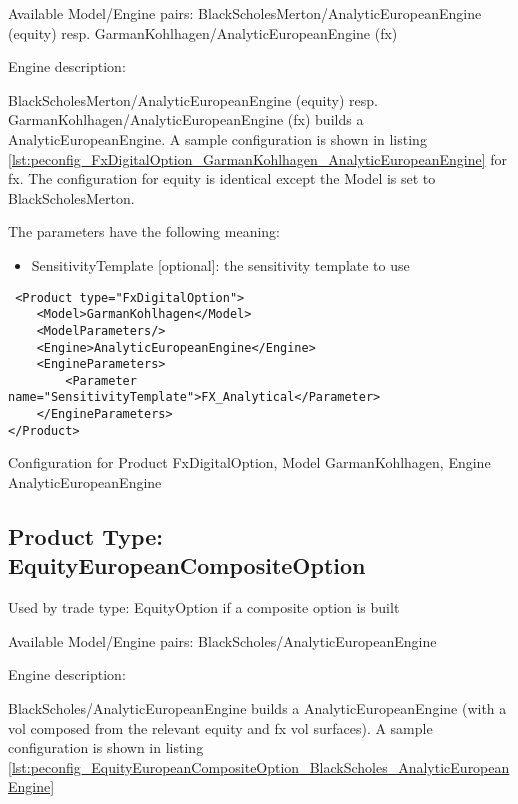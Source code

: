Available Model/Engine pairs: BlackScholesMerton/AnalyticEuropeanEngine (equity)
resp. GarmanKohlhagen/AnalyticEuropeanEngine (fx)

Engine description:

BlackScholesMerton/AnalyticEuropeanEngine (equity) resp. GarmanKohlhagen/AnalyticEuropeanEngine (fx) builds a
AnalyticEuropeanEngine. A sample configuration is shown in listing
\ref{lst:peconfig_FxDigitalOption_GarmanKohlhagen_AnalyticEuropeanEngine} for fx. The configuration for equity is
identical except the Model is set to BlackScholesMerton.

The parameters have the following meaning:

\begin{itemize}
\item SensitivityTemplate [optional]: the sensitivity template to use 
\end{itemize}

\begin{longlisting}
\begin{verbatim}
 <Product type="FxDigitalOption">
    <Model>GarmanKohlhagen</Model>
    <ModelParameters/>
    <Engine>AnalyticEuropeanEngine</Engine>
    <EngineParameters>
        <Parameter name="SensitivityTemplate">FX_Analytical</Parameter>
    </EngineParameters>
</Product>
\end{verbatim}
\caption{Configuration for Product FxDigitalOption, Model GarmanKohlhagen, Engine AnalyticEuropeanEngine}
\label{lst:peconfig_FxDigitalOption_GarmanKohlhagen_AnalyticEuropeanEngine}
\end{longlisting}

\subsection{Product Type: EquityEuropeanCompositeOption}

Used by trade type: EquityOption if a composite option is built

Available Model/Engine pairs: BlackScholes/AnalyticEuropeanEngine

Engine description:

BlackScholes/AnalyticEuropeanEngine builds a AnalyticEuropeanEngine (with a vol composed from the relevant equity and fx
vol surfaces). A sample configuration is shown in listing
\ref{lst:peconfig_EquityEuropeanCompositeOption_BlackScholes_AnalyticEuropeanEngine}

